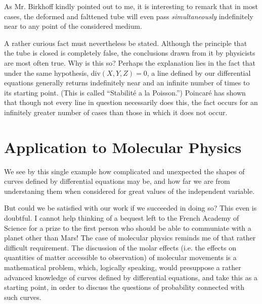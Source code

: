 \documentclass[12pt,oneside]{book}
\newcommand{\iit}[1]{\textit{#1}}
\begin{document}
As Mr. Birkhoff kindly pointed out to me, it is interesting to remark that in most cases, the deformed and falttened tube will even pass \iit{simultaneously} indefinitely near to any point of the considered medium. \par 

A rather curious fact must nevertheless be stated. Although the principle that the tube is closed is completely false, the conclusions drawn from it by physicists are most often true. Why is this so? Perhaps the explanation lies in the fact that under the same hypothesis, div$(X,Y,Z)=0$, a line defined by our differential equations generally returns indefinitely near and an infinite number of times to its starting point. (This is called ``Stabilit\'e a la Poisson.'') Poincar\'e has shown that though not every line in question necessarily does this, the fact occurs for an infinitely greater number of cases than those in which it does not occur. \par 

\section{Application to Molecular Physics}
We see by this single example how complicated and unexpected the shapes of curves defined by differential equations may be, and how far we are from understaning them when considered for great values of the independent variable. \par 

But could we be satisfied with our work if we succeeded in doing so? This even is doubtful. I cannot help thinking of a bequest left to the French Academy of Science for a prize to the first person who should be able to communiate with a planet other than Mars! The case of molecular physics reminds me of that rather difficult requirement. The discussion of the molar effects (i.e. the effects on quantities of matter accessible to observation) of molecular movements is a mathematical problem, which, logically speaking, would presuppose a rather advanced knowledge of curves defined by differential equations, and take this as a starting point, in order to discuss the questions of probability connected with such curves. \par 
\end{document}
